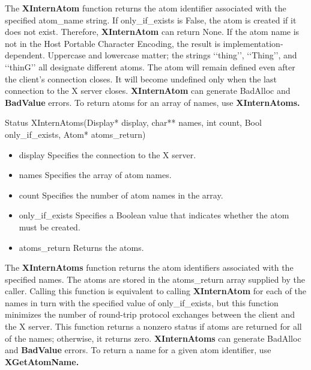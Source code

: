 \documentclass{report}
\begin{document}
\begin{itemize}
\begin{itemize}
        \end{itemize}
        The \textbf{XInternAtom} function returns the atom identifier associated with the specified atom\_name string. If only\_if\_exists is False, the atom is created if it does not exist. Therefore, \textbf{XInternAtom} can return None. If the atom name is not in the Host Portable Character Encoding, the result is implementation-dependent. Uppercase and lowercase matter; the strings ‘‘thing’’, ‘‘Thing’’, and ‘‘thinG’’ all designate different atoms. The atom will remain defined even after the client’s connection closes. It will become undefined only when the last connection to the X server closes.
        \bigbreak \noindent 
        \textbf{XInternAtom} can generate BadAlloc and \textbf{BadValue} errors.
        \bigbreak \noindent 
        To return atoms for an array of names, use \textbf{XInternAtoms.}
        \bigbreak \noindent 
        \begin{cppcode}
            Status XInternAtoms(Display* display, char** names, int count, Bool only_if_exists, Atom* atoms_return)
        \end{cppcode}
        \begin{itemize}
            \item display Specifies the connection to the X server.
            \item names Specifies the array of atom names.
            \item count Specifies the number of atom names in the array.
            \item only\_if\_exists Specifies a Boolean value that indicates whether the atom must be created.
            \item atoms\_return Returns the atoms.
        \end{itemize}
        The \textbf{XInternAtoms} function returns the atom identifiers associated with the specified names. The atoms are stored in the atoms\_return array supplied by the caller. Calling this function is equivalent to calling \textbf{XInternAtom} for each of the names in turn with the specified value of only\_if\_exists, but this function minimizes the number of round-trip protocol exchanges between the client and the X server. This function returns a nonzero status if atoms are returned for all of the names; otherwise, it returns zero.
        \bigbreak \noindent 
        \textbf{XInternAtoms} can generate BadAlloc and \textbf{BadValue} errors.
        \bigbreak \noindent 
        To return a name for a given atom identifier, use \textbf{XGetAtomName.}

\end{itemize}
\end{document}
